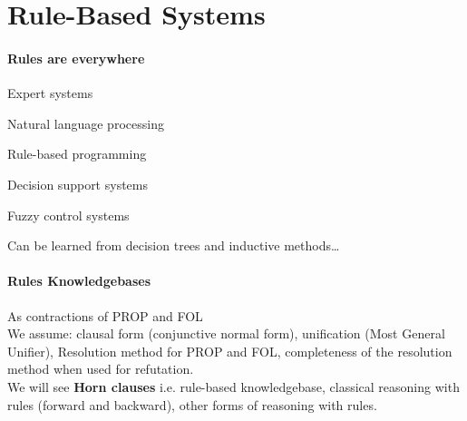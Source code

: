 \documentclass[10pt]{report}
\begin{document}
\section{Rule-Based Systems}
\paragraph{Rules are everywhere} \begin{list}{}{}
	\item Expert systems
	\item Natural language processing
	\item Rule-based programming
	\item Decision support systems
	\item Fuzzy control systems
	\item Can be learned from decision trees and inductive methods\ldots
\end{list}
\paragraph{Rules Knowledgebases} As contractions of PROP and FOL\\
We assume: clausal form (conjunctive normal form), unification (Most General Unifier), Resolution method for PROP and FOL, completeness of the resolution method when used for refutation.\\
We will see \textbf{Horn clauses} i.e. rule-based knowledgebase, classical reasoning with rules (forward and backward), other forms of reasoning with rules.
\end{document}
